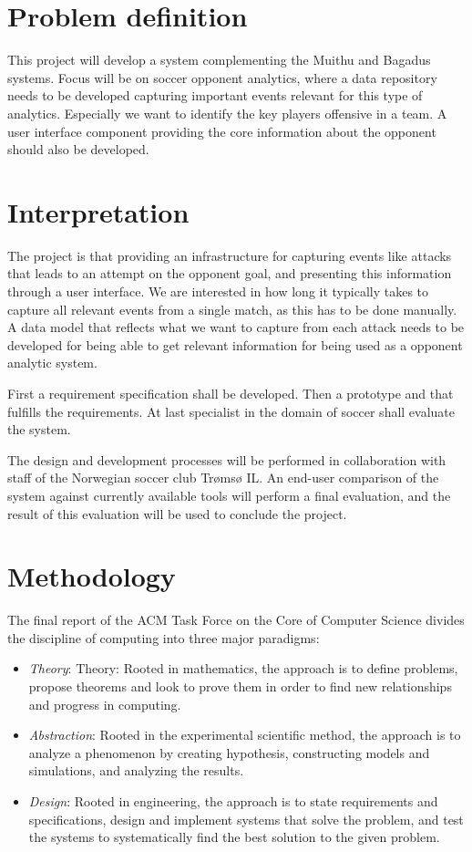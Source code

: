 \section{Problem definition}

This project will develop a system complementing the Muithu and Bagadus systems. Focus will be on soccer opponent analytics, where a data repository needs to be developed capturing important events relevant for this type of analytics. Especially we want to identify the key players offensive in a team. A user interface component providing the core information about the opponent should also be developed.

\section{Interpretation}

The project is that providing an infrastructure for capturing events like attacks that leads to an attempt on the opponent goal, and presenting this information through a user interface. We are interested in how long it typically takes to capture all relevant events from a single match, as this has to be done manually. A data model that reflects what we want to capture from each attack needs to be developed for being able to get relevant information for being used as a opponent analytic system.

First a requirement specification shall be developed. Then a prototype and that fulfills the requirements. At last specialist in the domain of soccer shall evaluate the system.

The design and development processes will be performed in collaboration with staff of the Norwegian soccer club Trømsø IL. An end-user comparison of the system against currently available tools will perform a final evaluation, and the result of this evaluation will be used to conclude the project.

\section{Methodology}

The final report of the ACM Task Force on the Core of Computer Science \cite{computing_as_a_discipline} divides the discipline of computing into three major paradigms:

\begin{itemize}
\item \emph{Theory}: 
Theory: Rooted in mathematics, the approach is to define problems, propose theorems and look to prove them in order to find new relationships and progress in computing.
\item \emph{Abstraction}: 
Rooted in the experimental scientific method, the approach is to analyze a phenomenon by creating hypothesis, constructing models and simulations, and analyzing the results.
\item \emph{Design}: 
Rooted in engineering, the approach is to state requirements and specifications, design and implement systems that solve the problem, and test the systems to systematically find the best solution to the given problem.

\end{itemize}

